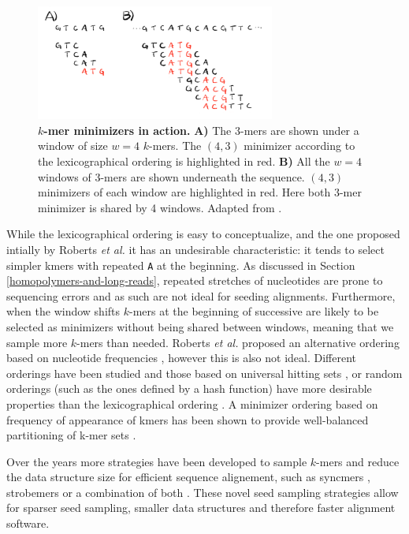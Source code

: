\documentclass[
  11pt,
  twoside,
  BCOR=10mm,
  listof=totoc]{scrbook}
\newcommand{\extcaption}[2]{
    \caption[#1]{
        \textbf{#1}\newline
        #2
    }
}
\begin{document}
\begin{figure}[h]
\centering
\includegraphics[width=0.7\textwidth]{./figures/Align-Intro/minimizers.png}
\extcaption{$k$-mer minimizers in action.}{\textbf{A)} The $3$-mers are shown under a window of size $w=4$ $k$-mers. The $(4,3)$ minimizer according to the lexicographical ordering is highlighted in red. \textbf{B)} All the $w=4$ windows of $3$-mers are shown underneath the sequence. $(4,3)$ minimizers of each window are highlighted in red. Here both $3$-mer minimizer is shared by 4 windows. Adapted from \autocite{robertsReducingStorageRequirements2004}.}
\label{fig:minimizers}
\end{figure}

While the lexicographical ordering is easy to conceptualize, and the one proposed intially by Roberts \emph{et al.} it has an undesirable characteristic: it tends to select simpler kmers with repeated \texttt{A} at the beginning. As discussed in Section \ref{homopolymers-and-long-reads}, repeated stretches of nucleotides are prone to sequencing errors and as such are not ideal for seeding alignments. Furthermore, when the window shifts \(k\)-mers at the beginning of successive are likely to be selected as minimizers without being shared between windows, meaning that we sample more \(k\)-mers than needed. Roberts \emph{et al.} proposed an alternative ordering based on nucleotide frequencies \autocite{robertsReducingStorageRequirements2004}, however this is also not ideal. Different orderings have been studied and those based on universal hitting sets \autocite{orensteinCompactUniversalKmer2016}, or random orderings (such as the ones defined by a hash function) have more desirable properties than the lexicographical ordering \autocite{marcaisImprovingPerformanceMinimizers2017}. A minimizer ordering based on frequency of appearance of kmers has been shown to provide well-balanced partitioning of k-mer sets \autocite{chikhiRepresentationBruijnGraphs2014}.

Over the years more strategies have been developed to sample \(k\)-mers and reduce the data structure size for efficient sequence alignement, such as syncmers \autocite{edgarSyncmersAreMore2021}, strobemers \autocite{sahlinEffectiveSequenceSimilarity2021} or a combination of both \autocite{sahlinFlexibleSeedSize2022}. These novel seed sampling strategies allow for sparser seed sampling, smaller data structures and therefore faster alignment software.
\end{document}
